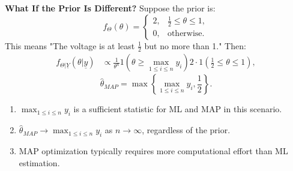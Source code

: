 \begin{example}
    \textbf{What If the Prior Is Different?}
    Suppose the prior is:
    \[
    f_\Theta(\theta) =
    \begin{cases}
        2, & \frac{1}{2} \leq \theta \leq 1, \\
        0, & \text{otherwise}.
    \end{cases}
    \]
    This means "The voltage is at least $\frac{1}{2}$ but no more than 1." Then:
    \begin{align*}
    f_{\Theta|\underline{Y}}(\theta|\underline{y}) &\propto \frac{1}{\theta^n} 1(\theta \geq \max_{1 \leq i \leq n} y_i) 2 \cdot 1\left(\frac{1}{2} \leq \theta \leq 1\right),
    \end{align*}
    \[
    \hat{\theta}_{MAP} = \max \left\{\max_{1 \leq i \leq n} y_i, \frac{1}{2}\right\}.
    \]
\end{example}

\begin{notes}
    \begin{enumerate}
        \item $\max_{1 \leq i \leq n} y_i$ is a sufficient statistic for ML and MAP in this scenario.
        \item $\hat{\theta}_{MAP} \to \max_{1 \leq i \leq n} y_i$ as $n \to \infty$, regardless of the prior.
        \item MAP optimization typically requires more computational effort than ML estimation.
    \end{enumerate}
\end{notes}